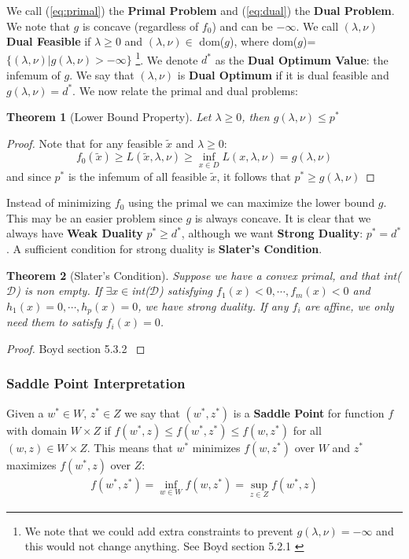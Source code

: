 \documentclass[]{article}
\theoremstyle{mattstyle}
\newtheorem{theorem}{Theorem}[section]
\theoremstyle{definition}
\begin{document}
We call (\ref{eq:primal}) the \textbf{Primal Problem} and (\ref{eq:dual}) the \textbf{Dual Problem}. We note that $g$ is concave (regardless of $f_0$) and can be $-\infty$. We call $(\lambda, \nu)$ \textbf{Dual Feasible} if $\lambda \ge 0$ and $(\lambda, \nu) \in$ dom($g$), where dom($g$)=$\{ (\lambda, \nu) | g(\lambda, \nu)>-\infty\}$ \footnote{We note that we could add extra constraints to prevent $g(\lambda, \nu)=-\infty$ and this would not change anything. See Boyd section 5.2.1 \cite{Boyd:2004:CO:993483}}. We denote $d^*$ as the \textbf{Dual Optimum Value}: the infemum of $g$. We say that $(\lambda,\nu)$ is \textbf{Dual Optimum} if it is dual feasible and $g(\lambda,\nu)=d^*$. We now relate the primal and dual problems:
\begin{theorem}[Lower Bound Property]
	Let $\lambda \ge 0$, then $g(\lambda, \nu) \le p^*$ 
\end{theorem}
\begin{proof}
	Note that for any feasible $\tilde{x}$ and $\lambda \ge 0$:
	$$f_0(\tilde{x}) \ge L(\tilde{x}, \lambda, \nu) \ge \inf\limits_{x\in D} L(x,\lambda,\nu) = g(\lambda, \nu)$$
	and since $p^*$ is the infemum of all feasible $\tilde{x}$, it follows that $ p^* \ge g(\lambda, \nu)$
\end{proof}

Instead of minimizing $f_0$ using the primal we can maximize the lower bound $g$. This may be an easier problem since $g$ is always concave. It is clear that we always have \textbf{Weak Duality} $p^* \ge d^*$, although we want \textbf{Strong Duality}: $p^* = d^*$. A sufficient condition for strong duality is \textbf{Slater's Condition}.

\begin{theorem}[Slater's Condition]
	Suppose we have a convex primal, and that int($\mathcal{D}$) is non empty. If $\exists x \in$int($\mathcal{D}$) satisfying $f_1(x)<0, \cdots, f_m(x)<0$ and $h_1(x)=0, \cdots, h_p(x)=0$, we have strong duality. If any $f_i$ are affine, we only need them to satisfy $f_i(x)=0$.
\end{theorem}
\begin{proof}
	Boyd section 5.3.2 \cite{Boyd:2004:CO:993483}
\end{proof}

\subsubsection{Saddle Point Interpretation}

Given a $w^*\in W$, $z^*\in Z$ we say that $(w^*,z^*)$ is a \textbf{Saddle Point} for function $f$ with domain $W \times Z$ if $f(w^*, z) \le f(w^*, z^*) \le f(w, z^*)$ for all $(w,z) \in W \times Z$. This means that $w^*$ minimizes $f(w, z^*)$ over $W$ and $z^*$ maximizes $f(w^*, z)$ over $Z$:
\begin{align*}
f(w^*, z^*) = \inf_{w \in W} f(w, z^*) = \sup_{z \in Z} f(w^*, z)
\end{align*}
\end{document}
